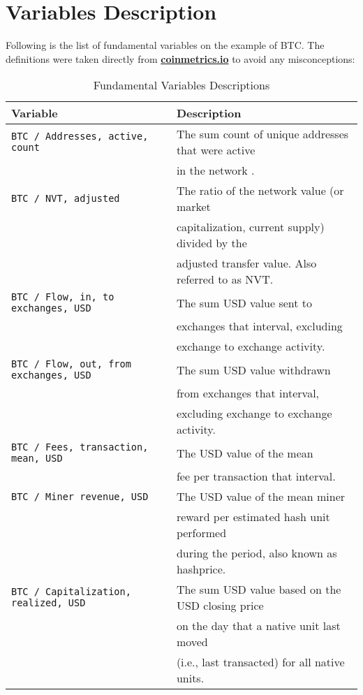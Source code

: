 \chapter{Variables Description}
\label{app:var_desc}
Following is the list of fundamental variables on the example of \ac{BTC}. The definitions were taken
directly from \textbf{\href{https://charts.coinmetrics.io/crypto-data/}{coinmetrics.io}} to avoid any misconceptions:

\begin{table}[htbp]
    \centering
    \begin{threeparttable}
    \caption{Fundamental Variables Descriptions}
    \label{tab:variables_fund}
    \begin{tabular}{ll}
    \toprule
    \textbf{Variable} & \textbf{Description} \\
    \midrule
    \texttt{BTC / Addresses, active, count} & The sum count of unique addresses that were active \\ & in the network .\\
    \texttt{BTC / NVT, adjusted} & The ratio of the network value (or market \\ & capitalization, current supply) divided by the \\ & adjusted transfer value. Also referred to as NVT. \\
    \texttt{BTC / Flow, in, to exchanges, USD} & The sum USD value sent to  \\ & exchanges that interval, excluding \\ & exchange to exchange activity. \\
    \texttt{BTC / Flow, out, from exchanges, USD} & The sum USD value withdrawn \\ & from exchanges that interval,  \\ & excluding exchange to exchange activity. \\
    \texttt{BTC / Fees, transaction, mean, USD} & The USD value of the mean \\ & fee per transaction that interval. \\
    \texttt{BTC / Miner revenue, USD} & The USD value of the mean miner \\ & reward per estimated hash unit performed \\ & during the period, also known as hashprice.\\
    \texttt{BTC / Capitalization, realized, USD} & The sum USD value based on the USD closing price \\ & on the day that a native unit last moved \\ & (i.e., last transacted) for all native units. \\

\end{tabular}
\end{threeparttable}
\end{table}
